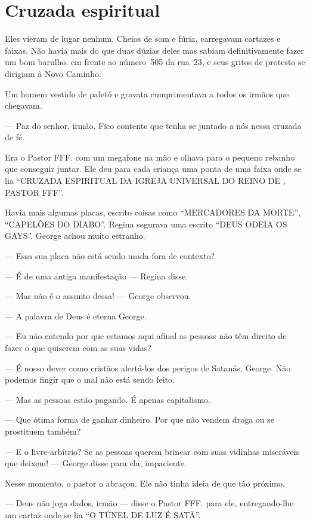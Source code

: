 \chapter{Cruzada espiritual}

Eles vieram de lugar nenhum. Cheios de som e fúria, carregavam cartazes e faixas. Não havia mais do que duas dúzias deles\mudanca{,} mas sabiam definitivamente fazer um bom barulho.  em frente ao número~505 da rua~23, e seus gritos de protesto se dirigiam à Novo Caminho.

Um homem vestido de paletó e gravata cumprimentava a todos os irmãos que chegavam.

--- Paz do senhor, irmão. Fico contente que tenha se juntado a nós nessa cruzada de fé.

Era o Pastor FFF.  com um megafone na mão e olhava para o pequeno rebanho que conseguir juntar. Ele deu para cada criança uma ponta de uma faixa onde se lia ``CRUZADA ESPIRITUAL DA IGREJA UNIVERSAL DO REINO DE , PASTOR FFF''.

Havia mais algumas placas, escrito coisas como ``MERCADORES DA MORTE'', ``CAPELÕES DO DIABO''. Regina segurava uma escrito ``DEUS ODEIA OS GAYS''. George achou muito estranho.

--- Essa sua placa não está sendo usada fora de contexto?

--- É de uma antiga manifestação --- Regina disse.

--- Mas não é o assunto dessa! --- George observou.

--- A palavra de Deus é eterna\mudanca{,} George.

--- Eu não entendo por que estamos aqui\mudanca{,} afinal as pessoas não têm direito de fazer o que quiserem com as suas vidas?

--- É nosso dever como cristãos alertá-los dos perigos de Satanás, George. Não podemos fingir que o mal não está sendo feito.

--- Mas as pessoas estão pagando. É apenas capitalismo.

--- Que ótima forma de ganhar dinheiro. Por que não vendem droga ou se prostituem também?

--- E o livre-arbítrio? Se as pessoas querem brincar com suas vidinhas miseráveis\mudanca{,} que deixem! --- George disse para ela, impaciente.

Nesse momento, o pastor o abraçou. Ele não tinha ideia de que  tão próximo.

--- Deus não joga dados, irmão --- disse o Pastor FFF. para ele, entregando-lhe um cartaz onde se lia ``O TÚNEL DE LUZ É SATÃ''.

